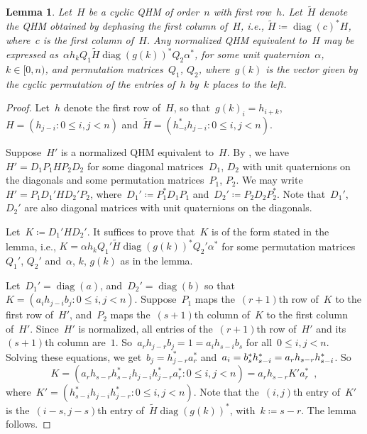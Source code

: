 \documentclass[12pt]{article}
\numberwithin{equation}{section}
\newtheorem{lemma}[theorem]{Lemma}
\newcommand{\adjoint}{*}
\newcommand{\eqdef}{\coloneqq}
\DeclareMathOperator{\diag}{diag}
\newcommand{\tH}{\widetilde{H}}
\begin{document}
\begin{lemma}
\label{lem-eq-cyclic-qhm}
Let\/~$H$ be a cyclic QHM of order\/~$n$ with first row\/~$h$. Let\/~$\tH$ denote the QHM obtained by dephasing the first column of\/~$H$, i.e., $\tH \eqdef \diag(c)^\adjoint H$, where\/~$c$ is the first column of\/~$H$. Any normalized QHM equivalent to\/~$H$ may be expressed as\/~$\alpha h_k Q_1 \tH \diag(g(k))^\adjoint Q_2 \alpha^*$, for some unit quaternion\/~$\alpha$, $k \in [0,n)$, and permutation matrices\/~$Q_1$, $Q_2$, where\/~$g(k)$ is the vector given by the cyclic permutation of the entries of\/~$h$ by\/~$k$ places to the left. 
\end{lemma}
\begin{proof}
Let~$h$ denote the first row of~$H$, so that~$g(k)_i = h_{i+k}$, $H = ( h_{j-i} : 0 \le i,j < n)$ and~$\tH = ( h_{-i}^* h_{j-i} : 0 \le i,j < n)$. 

Suppose~$H'$ is a normalized QHM equivalent to~$H$. By , we have~$H' = D_1 P_1 H P_2 D_2$ for some diagonal matrices~$D_1$, $D_2$ with unit quaternions on the diagonals and some permutation matrices~$P_1$, $P_2$. We may write~$H' = P_1 D_1' H D_2' P_2$, where~$D_1' \eqdef P_1^\adjoint D_1 P_1$ and~$D_2' \eqdef P_2 D_2 P_2^\adjoint$. Note that~$D_1'$, $D_2'$ are also diagonal matrices with unit quaternions on the diagonals. 

Let~$K \eqdef D_1' H D_2'$. It suffices to prove that~$K$ is of the form stated in the lemma, i.e., $K = \alpha h_k Q_1' \tH \diag(g(k))^\adjoint Q_2' \alpha^* $ for some permutation matrices~$Q_1'$, $Q_2'$ and~$\alpha$, $k$, $g(k)$ as in the lemma.

Let~$D_1' = \diag(a)$, and~$D_2' = \diag(b)$ so that~$K = (a_i h_{j-i} b_j : 0 \le i,j < n)$. Suppose~$P_1$ maps the~$(r+1)$th row of~$K$ to the first row of~$H'$, and~$P_2$ maps the~$(s+1)$th column of~$K$ to the first column of~$H'$. Since~$H'$ is normalized, all entries of the~$(r+1)$th row of~$H'$ and its~$(s+1)$th column are~$1$. So~$a_r h_{j-r} b_j = 1 = a_i h_{s-i} b_s$ for all~$0 \le i,j < n$. Solving these equations, we get~$b_j = h_{j-r}^* a_r^*$ and~$a_i = b_s^* h_{s-i}^* = a_r h_{s-r} h_{s-i}^* \mspace{0.7mu}$. So
\[
K = (a_r h_{s-r} h_{s-i}^* h_{j-i} h_{j-r}^* a_r^* : 0 \le i,j < n) = a_r h_{s-r} K' a_r^* \enspace,
\]
where~$K' = (h_{s-i}^* h_{j-i} h_{j-r}^* : 0 \le i,j < n)$. Note that the~$(i,j)$th entry of~$K'$ is the~$(i-s, j-s)$th entry of~$\tH \diag(g(k))^\adjoint$, with~$k \eqdef s-r$. The lemma follows.
\end{proof}
\end{document}
